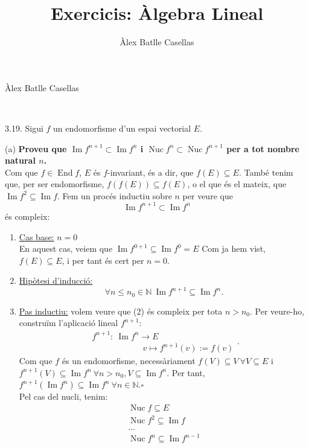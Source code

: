 \documentclass[11pt]{article}
\title{Exercicis: Àlgebra Lineal}
\author{Àlex Batlle Casellas}
\DeclareMathOperator{\nuc}{Nuc}
\DeclareMathOperator{\img}{Im}
\DeclareMathOperator{\End}{End}
\begin{document}
\begin{small}
Àlex Batlle Casellas
\end{small}\\

\begin{legal}
\item[3.19.] Sigui $f$ un endomorfisme d'un espai vectorial $E$.
	\item[(a) ]\textbf{Proveu que $\img{f^{n+1}}\subset\img{f^n}$ i $\nuc{f^n}\subset\nuc{f^{n+1}}$ per a tot nombre natural $n$.}\\
	Com que $f\in\End{f}$, $E$ és $f$-invariant, és a dir, que $f(E)\subseteq E$. També tenim que, per ser endomorfisme, $f(f(E))\subseteq f(E)$, o el que és el mateix, que $\img{f^2}\subseteq\img{f}$. Fem un procés inductiu sobre $n$ per veure que 
	\begin{equation}
		\img{f^{n+1}}\subset\img{f^n}
	\end{equation}
	és compleix:
	\begin{enumerate}
		\item \underline{Cas base:} $n=0$\\
		En aquest cas, veiem que $\img{f^{0+1}\subseteq\img{f^0}}=E$ Com ja hem vist, $f(E)\subseteq E$, i per tant és cert per $n=0$.
		\item \underline{Hipòtesi d'inducció:}
		\begin{equation}
			\forall n\leq n_0\in\mathbb{N}\ \img{f^{n+1}}\subseteq\img{f^n}.
		\end{equation}
		\item \underline{Pas inductiu:} volem veure que (2) és compleix per tota $n>n_0$. Per veure-ho, construïm l'aplicació lineal $f^{n+1}$:
		$$
		\begin{array}{lrr}
			f^{n+1}:\ \img{f^{n}}\longrightarrow E\\
			\qquad\qquad\qquad v\longmapsto f^{n+1}(v):=f(v)
		\end{array}.
		$$
		Com que $f$ és un endomorfisme, necessàriament $f(V)\subseteq V\ \forall V\subseteq E$ i $f^{n+1}(V)\subseteq\img{f^n}\ \forall n>n_0,V\subseteq\img{f^n}$. Per tant, $f^{n+1}(\img{f^n})\subseteq\img{f^n}\ \forall n\in\mathbb{N}$.$\square$\\
		Pel cas del nucli, tenim:
$$		\begin{array}{lll}
		\nuc{f}\subseteq E \\
		\nuc{f^2}\subseteq\img{f}\\
		\ldots\\
		\nuc{f^n}\subseteq\img{f^{n-1}}

\end{array}$$
\end{enumerate}
\end{legal}
\end{document}
